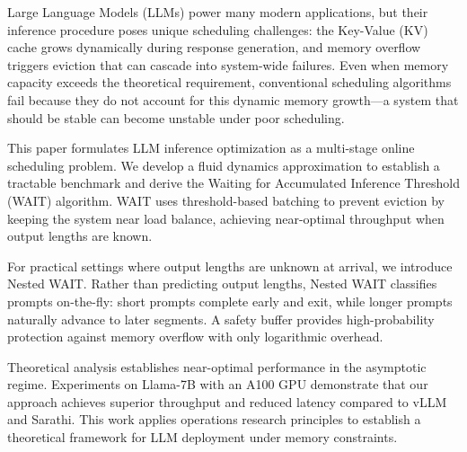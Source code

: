Large Language Models (LLMs) power many modern applications, but their inference procedure poses unique scheduling challenges: the Key-Value (KV) cache grows dynamically during response generation, and memory overflow triggers eviction that can cascade into system-wide failures. Even when memory capacity exceeds the theoretical requirement, conventional scheduling algorithms fail because they do not account for this dynamic memory growth---a system that should be stable can become unstable under poor scheduling.

This paper formulates LLM inference optimization as a multi-stage online scheduling problem. We develop a fluid dynamics approximation to establish a tractable benchmark and derive the Waiting for Accumulated Inference Threshold (WAIT) algorithm. WAIT uses threshold-based batching to prevent eviction by keeping the system near load balance, achieving near-optimal throughput when output lengths are known.

For practical settings where output lengths are unknown at arrival, we introduce Nested WAIT. Rather than predicting output lengths, Nested WAIT classifies prompts on-the-fly: short prompts complete early and exit, while longer prompts naturally advance to later segments. A safety buffer provides high-probability protection against memory overflow with only logarithmic overhead.

Theoretical analysis establishes near-optimal performance in the asymptotic regime. Experiments on Llama-7B with an A100 GPU demonstrate that our approach achieves superior throughput and reduced latency compared to vLLM and Sarathi. This work applies operations research principles to establish a theoretical framework for LLM deployment under memory constraints.
